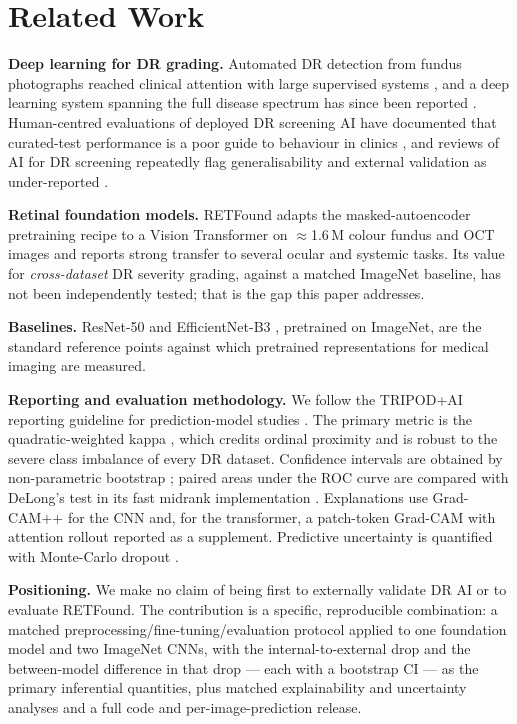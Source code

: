\documentclass[journal]{IEEEtran}
\renewcommand{\_}{\origunderscore\allowbreak}
\begin{document}
\section{Related Work}
\label{sec:related}

\textbf{Deep learning for DR grading.} Automated DR detection from fundus
photographs reached clinical attention with large supervised systems
\cite{gulshan2016,ting2017}, and a deep learning system spanning the full disease
spectrum has since been reported \cite{dai2021spectrum}. Human-centred
evaluations of deployed DR screening AI have documented that curated-test
performance is a poor guide to behaviour in clinics \cite{beede2020}, and reviews
of AI for DR screening repeatedly flag generalisability and external validation
as under-reported \cite{grzybowski2020review}.

\textbf{Retinal foundation models.} RETFound \cite{zhou2023retfound} adapts the
masked-autoencoder pretraining recipe \cite{he2022mae} to a Vision Transformer
\cite{dosovitskiy2021vit} on $\approx$1.6\,M colour fundus and OCT images and
reports strong transfer to several ocular and systemic tasks. Its value for
\emph{cross-dataset} DR severity grading, against a matched ImageNet baseline,
has not been independently tested; that is the gap this paper addresses.

\textbf{Baselines.} ResNet-50 \cite{he2016resnet} and EfficientNet-B3
\cite{tan2019efficientnet}, pretrained on ImageNet, are the standard reference
points against which pretrained representations for medical imaging are measured.

\textbf{Reporting and evaluation methodology.} We follow the TRIPOD+AI reporting
guideline for prediction-model studies \cite{tripodai2024}. The primary metric is
the quadratic-weighted kappa \cite{cohen1968kappa}, which credits ordinal
proximity and is robust to the severe class imbalance of every DR dataset.
Confidence intervals are obtained by non-parametric bootstrap
\cite{efron1994bootstrap}; paired areas under the ROC curve are compared with
DeLong's test \cite{delong1988} in its fast midrank implementation
\cite{sun2014fast}. Explanations use Grad-CAM++ \cite{chattopadhay2018gradcampp}
for the CNN and, for the transformer, a patch-token Grad-CAM with attention
rollout \cite{abnar2020rollout} reported as a supplement. Predictive uncertainty
is quantified with Monte-Carlo dropout \cite{gal2016dropout}.

\textbf{Positioning.} We make no claim of being first to externally validate DR
AI or to evaluate RETFound. The contribution is a specific, reproducible
combination: a matched preprocessing/fine-tuning/evaluation protocol applied to
one foundation model and two ImageNet CNNs, with the internal-to-external drop
and the between-model difference in that drop --- each with a bootstrap CI --- as
the primary inferential quantities, plus matched explainability and uncertainty
analyses and a full code and per-image-prediction release.
\end{document}
